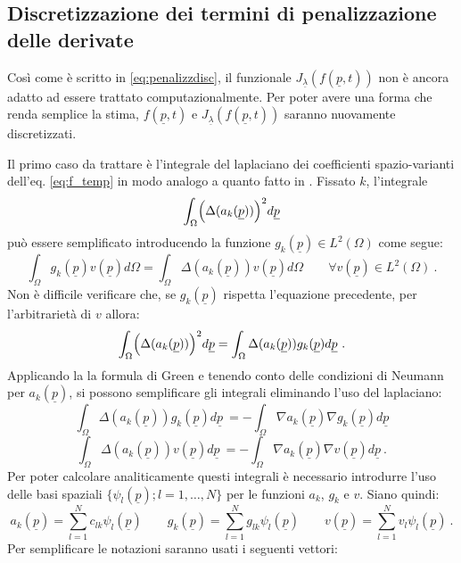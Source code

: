 \documentclass[a4paper,11pt,twoside,openright]{book}							%
\begin{document}
\subsection{Discretizzazione dei termini di penalizzazione delle derivate}
Così come è scritto in \ref{eq:penalizzdisc}, il funzionale $J_{\underline \lambda }(f(\underline{p},t))$ non è ancora adatto ad essere trattato computazionalmente. Per poter avere una forma che renda semplice la stima, $f(\underline{p},t)$ e $J_{\underline \lambda }(f(\underline{p},t))$ saranno nuovamente discretizzati. 

Il primo caso da trattare è l'integrale del laplaciano dei coefficienti spazio-varianti dell'eq. \ref{eq:f_temp} in modo analogo a quanto fatto in \cite{art:sangalli}. Fissato $k$, l'integrale
$$
\int_{\Omega} \Bigl( \Delta(  a_k(\underline p)  ) \Bigr)^2 d \underline p
$$
può essere semplificato introducendo la funzione $g_k(\underline p) \in L^2(\Omega)$ come segue:
\begin{equation}
\label{eq:ps1}
\int_\Omega g_k(\underline{p}) v(\underline{p}) d \Omega= \int_\Omega \Delta (a_k(\underline p)) v(\underline p) d \Omega\qquad \forall v(\underline{p}) \in L^2(\Omega) \ .
\end{equation}
Non è difficile verificare che, se $g_k(\underline p)$ rispetta l'equazione precedente, per l'arbitrarietà di $v$ allora:
\begin{equation}
\label{eq:ps2}
\int_{\Omega} \Bigl( \Delta(  a_k(\underline p)  ) \Bigr)^2 d \underline p = \int_{\Omega}  \Delta(  a_k(\underline p))g_k(\underline p)d \underline p \ .
\end{equation}
Applicando la la formula di Green e tenendo conto delle condizioni di Neumann per $a_k(\underline p)$, si possono semplificare gli integrali eliminando l'uso del laplaciano:
$$
\int_{\Omega}  \Delta(  a_k(\underline p))g_k(\underline p)d \underline p \ = -\int_{\Omega} \nabla  a_k(\underline p)\nabla g_k(\underline p)d \underline p
$$
$$
\int_{\Omega}  \Delta(  a_k(\underline p))v(\underline p)d \underline p \ = -\int_{\Omega} \nabla  a_k(\underline p)\nabla v(\underline p)d \underline p \ .
$$
Per poter calcolare analiticamente questi integrali è necessario introdurre l'uso delle basi spaziali $\{ \psi_l(\underline p);l=1, \ldots , N \}$ per le funzioni $a_k$, $g_k$ e $v$. Siano quindi:
$$
a_k(\underline p)=\sum_{l=1}^N c_{lk}\psi_l(\underline p) \qquad 
g_k(\underline p)=\sum_{l=1}^N g_{lk}\psi_l(\underline p) \qquad
v(\underline p)=\sum_{l=1}^N v_{l}\psi_l(\underline p) \ .
$$
Per semplificare le notazioni saranno usati i seguenti vettori:
\end{document}
